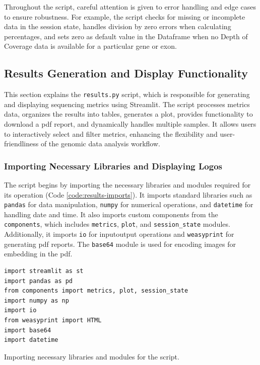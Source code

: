 Throughout the script, careful attention is given to error handling and edge cases to ensure robustness. For example, the script checks for missing or incomplete data in the session state, handles division by zero errors when calculating percentages, and sets zero as default value in the Dataframe when no Depth of Coverage data is available for a particular gene or exon.

\subsection{Results Generation and Display Functionality}

This section explains the \texttt{results.py} script, which is responsible for generating and displaying sequencing metrics using Streamlit. The script processes metrics data, organizes the results into tables, generates a plot, provides functionality to download a \ac{pdf} report, and dynamically handles multiple samples. It allows users to interactively select and filter metrics, enhancing the flexibility and user-friendliness of the genomic data analysis workflow.

\subsubsection{\textbf{Importing Necessary Libraries and Displaying Logos}}

The script begins by importing the necessary libraries and modules required for its operation (Code \ref{code:results-imports}). It imports standard libraries such as \texttt{pandas} for data manipulation, \texttt{numpy} for numerical operations, and \texttt{datetime} for handling date and time. It also imports custom components from the \texttt{components}, which includes \texttt{metrics}, \texttt{plot}, and \texttt{session\_state} modules. Additionally, it imports \texttt{io} for input\/output operations and \texttt{weasyprint} for generating \ac{pdf} reports. The \texttt{base64} module is used for encoding images for embedding in the \ac{pdf}.

\begin{longlisting}
\begin{verbatim}
import streamlit as st
import pandas as pd
from components import metrics, plot, session_state
import numpy as np
import io
from weasyprint import HTML
import base64
import datetime
\end{verbatim}
\caption{Importing necessary libraries and modules for the script.}
\label{code:results-imports}
\end{longlisting}

